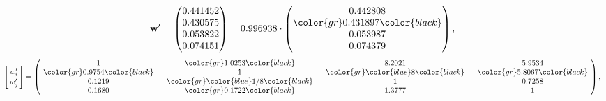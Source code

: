 \begin{example}
\begin{equation*}
\mathbf{w}^{\prime} =
\begin{pmatrix}
0.441452\\
0.430575\\
0.053822\\
0.074151
\end{pmatrix} =
0.996938\cdot
\begin{pmatrix}
0.442808\\
\color{gr} 0.431897\color{black} \\
0.053987\\
0.074379
\end{pmatrix},
\end{equation*}
\begin{equation*}
\left[ \frac{{w}^{\prime}_i}{{w}^{\prime}_j} \right] =
\begin{pmatrix}
$\,\,$ 1 $\,\,$ & $\,\,$\color{gr} 1.0253\color{black} $\,\,$ & $\,\,$8.2021$\,\,$ & $\,\,$5.9534$\,\,$ \\
$\,\,$\color{gr} 0.9754\color{black} $\,\,$ & $\,\,$ 1 $\,\,$ & $\,\,$\color{gr} \color{blue} 8\color{black} $\,\,$ & $\,\,$\color{gr} 5.8067\color{black}   $\,\,$ \\
$\,\,$0.1219$\,\,$ & $\,\,$\color{gr} \color{blue}  1/8\color{black} $\,\,$ & $\,\,$ 1 $\,\,$ & $\,\,$0.7258 $\,\,$ \\
$\,\,$0.1680$\,\,$ & $\,\,$\color{gr} 0.1722\color{black} $\,\,$ & $\,\,$1.3777$\,\,$ & $\,\,$ 1  $\,\,$ \\
\end{pmatrix},
\end{equation*}
\end{example}
\newpage
